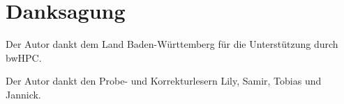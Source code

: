 \chapter*{Danksagung}

Der Autor dankt dem Land Baden-Württemberg für die Unterstützung durch bwHPC.

Der Autor dankt den Probe- und Korrekturlesern Lily, Samir, Tobias und Jannick.